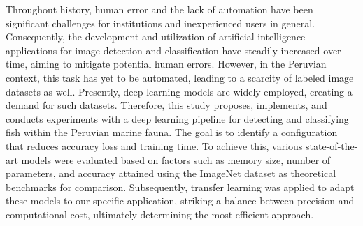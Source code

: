 Throughout history, human error and the lack of automation have been significant challenges for institutions and inexperienced users in general. Consequently, the development and utilization of artificial intelligence applications for image detection and classification have steadily increased over time, aiming to mitigate potential human errors. However, in the Peruvian context, this task has yet to be automated, leading to a scarcity of labeled image datasets as well. Presently, deep learning models are widely employed, creating a demand for such datasets. Therefore, this study proposes, implements, and conducts experiments with a deep learning pipeline for detecting and classifying fish within the Peruvian marine fauna. The goal is to identify a configuration that reduces accuracy loss and training time. To achieve this, various state-of-the-art models were evaluated based on factors such as memory size, number of parameters, and accuracy attained using the ImageNet dataset as theoretical benchmarks for comparison. Subsequently, transfer learning was applied to adapt these models to our specific application, striking a balance between precision and computational cost, ultimately determining the most efficient approach.